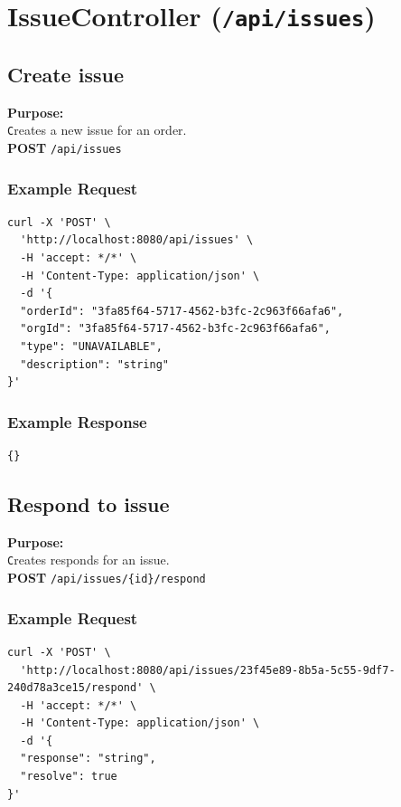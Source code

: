 \documentclass[a4paper,11pt]{article}
\begin{document}
\section{IssueController (\texttt{/api/issues})}

\subsection{Create issue}
\textbf{Purpose:} \\ \texttt Creates a new issue for an order. \\

\textbf{POST} \texttt{/api/issues}

\subsubsection*{Example Request}
\begin{lstlisting}
curl -X 'POST' \
  'http://localhost:8080/api/issues' \
  -H 'accept: */*' \
  -H 'Content-Type: application/json' \
  -d '{
  "orderId": "3fa85f64-5717-4562-b3fc-2c963f66afa6",
  "orgId": "3fa85f64-5717-4562-b3fc-2c963f66afa6",
  "type": "UNAVAILABLE",
  "description": "string"
}'
\end{lstlisting}

\subsubsection*{Example Response}
\begin{lstlisting}
{}
\end{lstlisting}

\subsection{Respond to issue}
\textbf{Purpose:} \\ \texttt Creates responds for an issue. \\

\textbf{POST} \texttt{/api/issues/\{id\}/respond}

\subsubsection*{Example Request}
\begin{lstlisting}
curl -X 'POST' \
  'http://localhost:8080/api/issues/23f45e89-8b5a-5c55-9df7-240d78a3ce15/respond' \
  -H 'accept: */*' \
  -H 'Content-Type: application/json' \
  -d '{
  "response": "string",
  "resolve": true
}'
\end{lstlisting}
\end{document}
